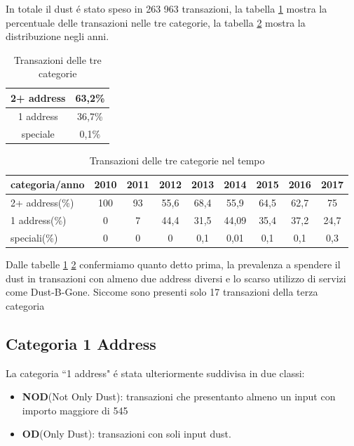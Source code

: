 In totale il dust é stato speso in 263 963 transazioni, la tabella \ref{tab:tx_categories} mostra la percentuale delle transazioni nelle tre categorie, la tabella \ref{tab:tx_categories_year} mostra la distribuzione negli anni.
\begin{table}[H]
    \centering
    \begin{tabular}{|c|c|}
        \hline
        2+ address & 63,2\%\\
        \hline
        1 address & 36,7\%\\
        \hline
        speciale & 0,1\%\\
        \hline
    \end{tabular}
    \caption{Transazioni delle tre categorie}
    \label{tab:tx_categories}
\end{table}
\begin{table}[H]
    \centering
    \begin{tabular}{|l|c|c|c|c|c|c|c|c|}
        \hline
            categoria/anno  & 2010 & 2011 & 2012 & 2013 & 2014 & 2015 & 2016 & 2017\\
        \hline 
         2+ address(\%) & 100 & 93 & 55,6 & 68,4 & 55,9 & 64,5 & 62,7 & 75 \\
         \hline
         1 address(\%) & 0 & 7 & 44,4 & 31,5 & 44,09 & 35,4 & 37,2 & 24,7  \\
         \hline
         speciali(\%) & 0 & 0 & 0 & 0,1 & 0,01 & 0,1 & 0,1 & 0,3 \\
         \hline
    \end{tabular}
    \caption{Transazioni delle tre categorie nel tempo}
    \label{tab:tx_categories_year}
\end{table}
Dalle tabelle \ref{tab:tx_categories} \ref{tab:tx_categories_year} confermiamo quanto detto prima, la prevalenza a spendere il dust in transazioni con almeno due address diversi e lo scarso utilizzo di servizi come Dust-B-Gone. Siccome sono presenti solo 17 transazioni della terza categoria 
\subsection{Categoria 1 Address}
La categoria ``1 address" é stata ulteriormente suddivisa in due classi:
\begin{itemize}
    \item \textbf{NOD}(Not Only Dust): transazioni che presentanto almeno un input con importo maggiore di 545  
    \item \textbf{OD}(Only Dust): transazioni con soli input dust.
\end{itemize}

